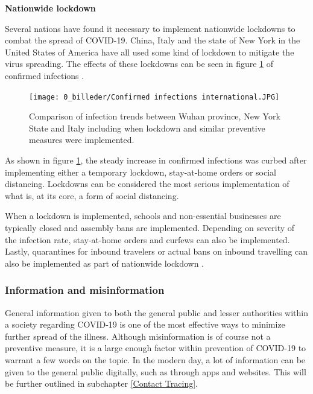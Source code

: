 \textbf{Nationwide lockdown}

Several nations have found it necessary to implement nationwide lockdowns to combat the spread of COVID-19. China, Italy and the state of New York in the United States of America have all used some kind of lockdown to mitigate the virus spreading. The effects of these lockdowns can be seen in figure \ref{fig:Confirmed-infections-international} of confirmed infections \citep{zhang_identifying_2020}.

\begin{figure}[H]
    \centering
    \texttt{[image: 0\_billeder/Confirmed infections international.JPG]}
    \caption{Comparison of infection trends between Wuhan province, New York State and Italy including when lockdown and similar preventive measures were implemented.
    \citep{zhang_identifying_2020}}
    \label{fig:Confirmed-infections-international}
\end{figure}

As shown in figure \ref{fig:Confirmed-infections-international}, the steady increase in confirmed infections was curbed after implementing either a temporary lockdown, stay-at-home orders or social distancing. Lockdowns can be considered the most serious implementation of what is, at its core, a form of social distancing. 

When a lockdown is implemented, schools and non-essential businesses are typically closed and assembly bans are implemented. Depending on severity of the infection rate, stay-at-home orders and curfews can also be implemented. Lastly, quarantines for inbound travelers or actual bans on inbound travelling can also be implemented as part of nationwide lockdown \citep{gostin_governmental_2020}.




\subsubsection{Information and misinformation}

General information given to both the general public and lesser authorities within a society regarding COVID-19 is one of the most effective ways to minimize further spread of the illness. Although misinformation is of course not a preventive measure, it is a large enough factor within prevention of COVID-19 to warrant a few words on the topic. In the modern day, a lot of information can be given to the general public digitally, such as through apps and websites. This will be further outlined in subchapter \ref{Contact Tracing}.

